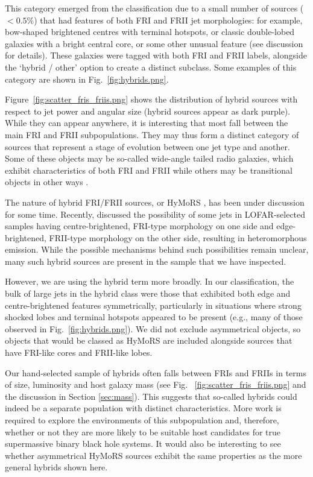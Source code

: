 \documentclass{aa}
\begin{document}
This category emerged from the classification due to a small number of sources ($<0.5\%$) that had features of both FRI and FRII jet morphologies: for example, bow-shaped brightened centres with terminal hotspots, or classic double-lobed galaxies with a bright central core, or some other unusual feature (see discussion for details). These galaxies were tagged with both FRI and FRII labels, alongside the `hybrid / other' option to create a distinct subclass. Some examples of this category are shown in Fig.~\ref{fig:hybrids.png}.

Figure~\ref{fig:scatter_fris_friis.png} shows the distribution of hybrid sources with respect to jet power and angular size (hybrid sources appear as dark purple). While they can appear anywhere, it is interesting that most fall between the main FRI and FRII subpopulations. They may thus form a distinct category of sources that represent a stage of evolution between one jet type and another. Some of these objects may be so-called wide-angle tailed radio galaxies, which exhibit characteristics of both FRI and FRII \citep{hardcastle04} while others may be transitional objects in other ways \citep{mingo19}.

The nature of hybrid FRI/FRII sources, or HyMoRS \citep{Gopal-Krishna+Wiita00}, has been under discussion for some time. Recently, \cite{mingo19} discussed the possibility of some jets in LOFAR-selected samples having centre-brightened, FRI-type morphology on one side and edge-brightened, FRII-type morphology on the other side, resulting in heteromorphous emission. While the possible mechanisms behind such possibilities remain unclear, many such hybrid sources are present in the sample that we have inspected.

However, we are using the hybrid term more broadly. In our classification, the bulk of large jets in the hybrid class were those that exhibited both edge and centre-brightened features symmetrically, particularly in situations where strong shocked lobes and terminal hotspots appeared to be present (e.g., many of those observed in Fig.~\ref{fig:hybrids.png}). We did not exclude asymmetrical objects, so objects that would be classed as HyMoRS are included alongside sources that have FRI-like cores and FRII-like lobes.

Our hand-selected sample of hybrids often falls between FRIs and FRIIs in terms of size, luminosity and host galaxy mass (see Fig.~ \ref{fig:scatter_fris_friis.png} and the discussion in Section \ref{sec:mass}). This suggests that so-called hybrids could indeed be a separate population with distinct characteristics. More work is required to explore the environments of this subpopulation and, therefore, whether or not they are more likely to be suitable host candidates for true supermassive binary black hole systems. It would also be interesting to see whether asymmetrical HyMoRS sources exhibit the same properties as the more general hybrids shown here.
\end{document}
